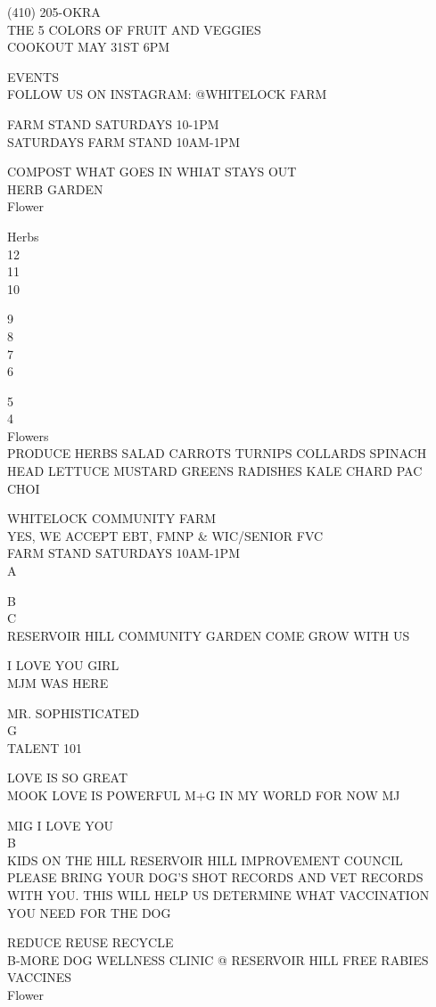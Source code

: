 \documentclass[10pt,letterpaper]{article}
\begin{document}
(410) 205{-}OKRA\\
THE 5 COLORS OF FRUIT AND VEGGIES\\
COOKOUT MAY 31ST 6PM

EVENTS\\
FOLLOW US ON INSTAGRAM: @WHITELOCK FARM

FARM STAND SATURDAYS 10{-}1PM\\
SATURDAYS FARM STAND 10AM{-}1PM

COMPOST WHAT GOES IN WHIAT STAYS OUT\\
HERB GARDEN\\
Flower

Herbs\\
12\\
11\\
10

9\\
8\\
7\\
6

5\\
4\\
Flowers\\
PRODUCE HERBS SALAD CARROTS TURNIPS COLLARDS SPINACH HEAD LETTUCE MUSTARD GREENS RADISHES KALE CHARD PAC CHOI

WHITELOCK COMMUNITY FARM\\
YES, WE ACCEPT EBT, FMNP \& WIC/SENIOR FVC\\
FARM STAND SATURDAYS 10AM{-}1PM\\
A

B\\
C\\
RESERVOIR HILL COMMUNITY GARDEN COME GROW WITH US

I LOVE YOU GIRL\\
MJM WAS HERE

MR. SOPHISTICATED\\
G\\
TALENT 101

LOVE IS SO GREAT\\
MOOK LOVE IS POWERFUL M+G IN MY WORLD FOR NOW MJ

MIG I LOVE YOU\\
B\\
KIDS ON THE HILL RESERVOIR HILL IMPROVEMENT COUNCIL\\
PLEASE BRING YOUR DOG'S SHOT RECORDS AND VET RECORDS WITH YOU.  THIS WILL HELP US DETERMINE WHAT VACCINATION YOU NEED FOR THE DOG

REDUCE REUSE RECYCLE\\
B{-}MORE DOG WELLNESS CLINIC @ RESERVOIR HILL FREE RABIES VACCINES\\
Flower
\end{document}

